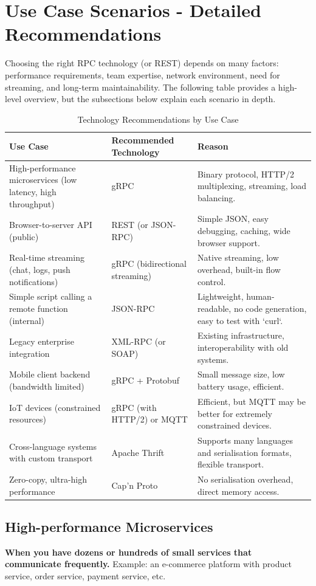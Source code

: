 \documentclass[10pt,a4paper]{article}
\begin{document}
\section{Use Case Scenarios - Detailed Recommendations}

Choosing the right RPC technology (or REST) depends on many factors: performance requirements, team expertise, network environment, need for streaming, and long-term maintainability. The following table provides a high-level overview, but the subsections below explain each scenario in depth.

\begin{table}[H]
\centering
\begin{tabular}{|p{4.5cm}|p{4cm}|p{5cm}|}
\hline
\textbf{Use Case} & \textbf{Recommended Technology} & \textbf{Reason} \\
\hline
High-performance microservices (low latency, high throughput) & gRPC & Binary protocol, HTTP/2 multiplexing, streaming, load balancing. \\
Browser-to-server API (public) & REST (or JSON-RPC) & Simple JSON, easy debugging, caching, wide browser support. \\
Real-time streaming (chat, logs, push notifications) & gRPC (bidirectional streaming) & Native streaming, low overhead, built-in flow control. \\
Simple script calling a remote function (internal) & JSON-RPC & Lightweight, human-readable, no code generation, easy to test with `curl`. \\
Legacy enterprise integration & XML-RPC (or SOAP) & Existing infrastructure, interoperability with old systems. \\
Mobile client backend (bandwidth limited) & gRPC + Protobuf & Small message size, low battery usage, efficient. \\
IoT devices (constrained resources) & gRPC (with HTTP/2) or MQTT & Efficient, but MQTT may be better for extremely constrained devices. \\
Cross-language systems with custom transport & Apache Thrift & Supports many languages and serialisation formats, flexible transport. \\
Zero-copy, ultra-high performance & Cap’n Proto & No serialisation overhead, direct memory access. \\
\hline
\end{tabular}
\caption{Technology Recommendations by Use Case}
\end{table}

\subsection{High-performance Microservices}
\textbf{When you have dozens or hundreds of small services that communicate frequently.} Example: an e-commerce platform with product service, order service, payment service, etc.
\end{document}
